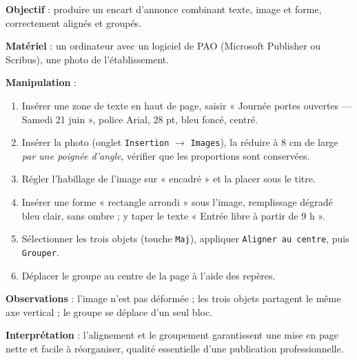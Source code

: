 \documentclass[11pt]{article}
\begin{document}
\begin{experience}
\textbf{Objectif} : produire un encart d'annonce combinant texte, image et forme, correctement alignés et groupés.\par
\textbf{Matériel} : un ordinateur avec un logiciel de PAO (Microsoft Publisher ou Scribus), une photo de l'établissement.\par
\textbf{Manipulation} :
\begin{enumerate}
\item Insérer une zone de texte en haut de page, saisir « Journée portes ouvertes — Samedi 21 juin », police Arial, 28 pt, bleu foncé, centré.
\item Insérer la photo (onglet \texttt{Insertion} $\rightarrow$ \texttt{Images}), la réduire à 8 cm de large \emph{par une poignée d'angle}, vérifier que les proportions sont conservées.
\item Régler l'habillage de l'image sur « encadré » et la placer sous le titre.
\item Insérer une forme « rectangle arrondi » sous l'image, remplissage dégradé bleu clair, sans ombre ; y taper le texte « Entrée libre à partir de 9 h ».
\item Sélectionner les trois objets (touche \texttt{Maj}), appliquer \texttt{Aligner au centre}, puis \texttt{Grouper}.
\item Déplacer le groupe au centre de la page à l'aide des repères.
\end{enumerate}
\textbf{Observations} : l'image n'est pas déformée ; les trois objets partagent le même axe vertical ; le groupe se déplace d'un seul bloc.\par
\textbf{Interprétation} : l'alignement et le groupement garantissent une mise en page nette et facile à réorganiser, qualité essentielle d'une publication professionnelle.
\end{experience}
\end{document}
